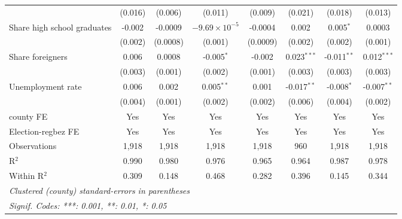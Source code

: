 \begin{table}[htbp]
\begin{tabular}{lccccccc}
                                                              & (0.016)        & (0.006)        & (0.011)                & (0.009)        & (0.021)        & (0.018)        & (0.013)\\   
      Share high school graduates                             & -0.002         & -0.0009        & $-9.69\times 10^{-5}$  & -0.0004        & 0.002          & 0.005$^{*}$    & 0.0003\\   
                                                              & (0.002)        & (0.0008)       & (0.001)                & (0.0009)       & (0.002)        & (0.002)        & (0.001)\\   
      Share foreigners                                        & 0.006          & 0.0008         & -0.005$^{*}$           & -0.002         & 0.023$^{***}$  & -0.011$^{**}$  & 0.012$^{***}$\\   
                                                              & (0.003)        & (0.001)        & (0.002)                & (0.001)        & (0.003)        & (0.003)        & (0.003)\\   
      Unemployment rate                                       & 0.006          & 0.002          & 0.005$^{**}$           & 0.001          & -0.017$^{**}$  & -0.008$^{*}$   & -0.007$^{**}$\\   
                                                              & (0.004)        & (0.001)        & (0.002)                & (0.002)        & (0.006)        & (0.004)        & (0.002)\\   
      county FE                                               & Yes            & Yes            & Yes                    & Yes            & Yes            & Yes            & Yes\\  
      Election-regbez FE                                      & Yes            & Yes            & Yes                    & Yes            & Yes            & Yes            & Yes\\  
      Observations                                            & 1,918          & 1,918          & 1,918                  & 1,918          & 960            & 1,918          & 1,918\\  
      R$^2$                                                   & 0.990          & 0.980          & 0.976                  & 0.965          & 0.964          & 0.987          & 0.978\\  
      Within R$^2$                                            & 0.309          & 0.148          & 0.468                  & 0.282          & 0.396          & 0.145          & 0.344\\  
      \midrule \midrule
      \multicolumn{8}{l}{\emph{Clustered (county) standard-errors in parentheses}}\\
      \multicolumn{8}{l}{\emph{Signif. Codes: ***: 0.001, **: 0.01, *: 0.05}}\\
   \end{tabular}
\end{table}


